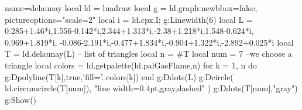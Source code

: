 \begin{luadraw}{name=delaunay}
local ld = luadraw
local g = ld.graph:new{bbox=false, pictureoptions="scale=2"}
local i = ld.cpx.I; g:Linewidth(6)
local L = {0.285+1.46*i,1.556-0.142*i,2.344+1.313*i,-2.38+1.218*i,1.548-0.624*i,
0.969+1.819*i, -0.086-2.191*i,-0.477+1.834*i,-0.904+1.322*i,-2.892+0.025*i}
local T = ld.delaunay(L) -- list of triangles
local n = #T
local num = 7 --we choose a triangle
local colors = ld.getpalette(ld.palGasFlame,n)
for k = 1, n do
    g:Dpolyline(T[k],true,'fill='..colors[k])
    end
g:Ddots(L)
g:Dcircle( {ld.circumcircle(T[num])}, "line width=0.4pt,gray,dashed" )
g:Ddots(T[num],"gray")
g:Show()
\end{luadraw}
